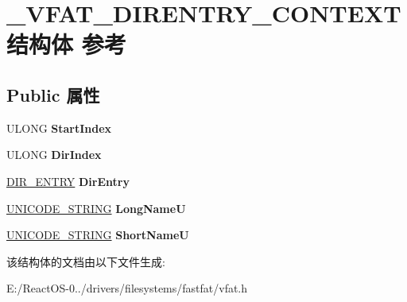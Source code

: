 \hypertarget{struct___v_f_a_t___d_i_r_e_n_t_r_y___c_o_n_t_e_x_t}{}\section{\+\_\+\+V\+F\+A\+T\+\_\+\+D\+I\+R\+E\+N\+T\+R\+Y\+\_\+\+C\+O\+N\+T\+E\+X\+T结构体 参考}
\label{struct___v_f_a_t___d_i_r_e_n_t_r_y___c_o_n_t_e_x_t}
\subsection*{Public 属性}
\begin{DoxyCompactItemize}
\item 
\mbox{\label{struct___v_f_a_t___d_i_r_e_n_t_r_y___c_o_n_t_e_x_t_a8074c9380ce4cd34c3959dab5a63f2eb}} 
U\+L\+O\+NG {\bfseries Start\+Index}
\item 
\mbox{\label{struct___v_f_a_t___d_i_r_e_n_t_r_y___c_o_n_t_e_x_t_adfc0a071fd82a665c85ed31d0b8671ca}} 
U\+L\+O\+NG {\bfseries Dir\+Index}
\item 
\mbox{\label{struct___v_f_a_t___d_i_r_e_n_t_r_y___c_o_n_t_e_x_t_abc9d9bee69118a777400b667a92e469a}} 
\hyperlink{union___d_i_r___e_n_t_r_y}{D\+I\+R\+\_\+\+E\+N\+T\+RY} {\bfseries Dir\+Entry}
\item 
\mbox{\label{struct___v_f_a_t___d_i_r_e_n_t_r_y___c_o_n_t_e_x_t_aa6f7f32517fdaf61a4c1660a6d7e506d}} 
\hyperlink{struct___u_n_i_c_o_d_e___s_t_r_i_n_g}{U\+N\+I\+C\+O\+D\+E\+\_\+\+S\+T\+R\+I\+NG} {\bfseries Long\+NameU}
\item 
\mbox{\label{struct___v_f_a_t___d_i_r_e_n_t_r_y___c_o_n_t_e_x_t_a7bc08e7d5ad11b3ed36985034fee2bd8}} 
\hyperlink{struct___u_n_i_c_o_d_e___s_t_r_i_n_g}{U\+N\+I\+C\+O\+D\+E\+\_\+\+S\+T\+R\+I\+NG} {\bfseries Short\+NameU}
\end{DoxyCompactItemize}


该结构体的文档由以下文件生成\+:\begin{DoxyCompactItemize}
\item 
E\+:/\+React\+O\+S-\/0../drivers/filesystems/fastfat/vfat.\+h\end{DoxyCompactItemize}
